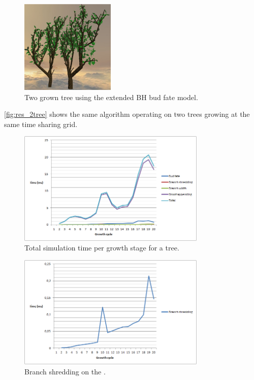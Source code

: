\documentclass[11pt]{article} %
\begin{document}
\begin{figure}[htp]
	\centering
	\includegraphics[width=0.4\textwidth]{2tree.png}
	\caption{Two grown tree using the extended BH bud fate model.}
	\label{fig:res_2tree}
\end{figure}

\autoref{fig:res_2tree} shows the same algorithm operating on two trees growing at the same time sharing grid.

\begin{figure}[htp]
	\centering
	\includegraphics[width=0.8\textwidth]{timingTotal.png}
	\caption{Total simulation time per growth stage for a tree.}
	\label{fig:res_timingTotal}
\end{figure}

\begin{figure}[htp]
	\centering
	\includegraphics[width=0.8\textwidth]{timingBranchShred.png}
	\caption{Branch shredding on the .}
	\label{fig:res_timingTotal}
\end{figure}
\end{document}
